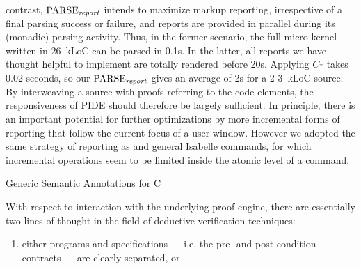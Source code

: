 \begin{isabellebody}
\begin{isamarkuptext}
contrast, $\text{PARSE}_{\text{\emph{report}}}$ intends to maximize markup reporting, irrespective
of a final parsing success or failure, and reports are provided in parallel during its (monadic)
parsing activity. Thus, in the former scenario, the full micro-kernel written in 26~kLoC can be
parsed in 0.1s. In the latter, all reports we have thought helpful to implement are totally rendered
before 20s. Applying $C^\downarrow$ takes 0.02 seconds, so our $\text{PARSE}_{\text{\emph{report}}}$
gives an average of 2s for a 2-3~kLoC source. By interweaving a source with proofs referring to the
code elements, the responsiveness of PIDE should therefore be largely sufficient. In principle,
there is an important potential for further optimizations by more incremental forms of reporting
that follow the current focus of a user window. However we adopted the same strategy of reporting as
 and general Isabelle commands, for which incremental operations
seem to be limited inside the atomic level of a command.%
\end{isamarkuptext}\isamarkuptrue%
%
\begin{isamarkupsection*}%
[label = {annotations},type = {scholarly_paper.technical}, args={label = {annotations},type = {scholarly_paper.technical}, Isa_COL.text_element.level = {}, Isa_COL.text_element.referentiable = {False}, Isa_COL.text_element.variants = {{STR ''outline'', STR ''document''}}, scholarly_paper.text_section.main_author = {}, scholarly_paper.text_section.fixme_list = {}, Isa_COL.text_element.level = {}, scholarly_paper.technical.definition_list = {}}]Generic Semantic Annotations for C%
\end{isamarkupsection*}\isamarkuptrue%
%
\begin{isamarkuptext}%
With respect to interaction with the underlying proof-engine, there are essentially two
lines of thought in the field of deductive verification techniques:

%
\begin{enumerate}%
\item either programs and specifications --- i.e. the pre- and post-condition contracts --- are clearly 
separated, or


\end{enumerate}
\end{isamarkuptext}
\end{isabellebody}
